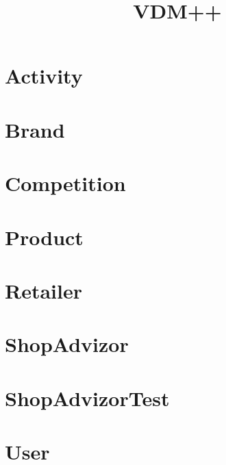 \documentclass{article}
\begin{document}
\title{VDM++}
\author{}
\maketitle
\tableofcontents

\section{Activity}

\section{Brand}

\section{Competition}

\section{Product}

\section{Retailer}

\section{ShopAdvizor}

\section{ShopAdvizorTest}

\section{User}

\end{document}
